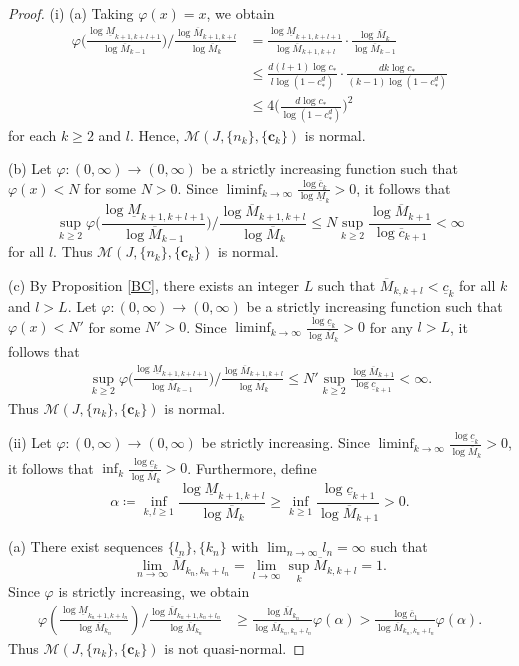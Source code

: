 \documentclass[12pt]{amsart}
\numberwithin{equation}{section}
\theoremstyle{plain}
\theoremstyle{remark}
\theoremstyle{definition}
\newcommand{\om}{\overline{M}}
\newcommand{\um}{\underline{M}}
\newcommand{\ccc}{\mathbf{c}}
\newcommand{\f}{\frac}
\newcommand{\oc}{\overline{c}}
\newcommand{\uc}{\underline{c}}
\renewcommand{\ge}{\geqslant}
\renewcommand{\le}{\leqslant}
\begin{document}
	\begin{proof}%
		(i) (a) Taking $\varphi(x)=x$,  we obtain
		\begin{align*}
			\varphi\Big(\frac{\log \um_{k+1,k+l+1}}{\log \om_{k-1}}\Big)\Big/\frac{\log \om_{k+1,k+l}}{\log \om_{k}}&=\f{\log \um_{k+1,k+l+1}}{\log \om_{k+1,k+l}}\cdot \f{\log \om_k}{\log \om_{k-1}}\\
			&\le \f{d(l+1)\log c_*}{l\log (1-c_*^d)}\cdot \f{dk\log c_*}{(k-1)\log (1-c_*^d)}\\
			&\le 4 \Big(\f{d\log c_*}{\log (1-c_*^d)}\Big)^2
		\end{align*}
		for each $k\ge 2$ and $l$. Hence, $\mathcal{M}(J,\{n_k\},\{\ccc_k\})$ is normal. 
		
		(b)  Let $\varphi:(0,\infty)\to (0,\infty)$ be a strictly increasing function such that $\varphi(x)<N$ for some $N>0$. Since $\liminf_{k\to\infty}\f{\log \oc_k}{\log \um_k}>0$,  it follows that
		\[
		\sup_{k\ge 2}\varphi\Big(\frac{\log \um_{k+1,k+l+1}}{\log \om_{k-1}}\Big)\Big/\frac{\log \om_{k+1,k+l}}{\log \om_{k}}\le N\sup_{k\ge 2}\frac{\log \om_{k+1}}{\log \oc_{k+1}}<\infty
		\]
		for all $l$.
		Thus $\mathcal{M}(J,\{n_k\},\{\ccc_k\})$ is normal.
		
		(c) By Proposition \ref{BC}, there exists an integer $L$ such that $	\om_{k,k+l}<\uc_k $	for all $k$ and $l>L$. Let $\varphi:(0,\infty)\to (0,\infty)$ be a strictly increasing function such that $\varphi(x)<N'$ for some $N'>0$. Since $\liminf_{k\to\infty}\f{\log \uc_k}{\log \om_k}>0$ for any $l>L$, it follows that
		\begin{align*}
			\sup_{k\ge 2}\varphi\Big(\frac{\log \um_{k+1,k+l+1}}{\log \om_{k-1}}\Big)\Big/\frac{\log \om_{k+1,k+l}}{\log \om_{k}}\le N'\sup_{k\ge 2}\frac{\log \om_{k+1}}{\log \uc_{k+1}}<\infty.
		\end{align*}
		Thus $\mathcal{M}(J,\{n_k\},\{\ccc_k\})$ is normal.
		
		
		
		
		(ii) Let $\varphi:(0,\infty)\to (0,\infty)$ be strictly increasing. Since $\liminf_{k\to\infty}\frac{\log \uc_k}{\log \om_k}>0$, it follows that $\inf_k \frac{\log \uc_k}{\log \om_k}>0$. Furthermore, define
        \[
		\alpha\coloneq\inf_{k,l\ge 1}\f{\log \um_{k+1,k+l}}{\log \om_k}\ge \inf_{k\ge 1}\f{\log \uc_{k+1}}{\log \om_{k+1}}>0.
		\]
	
		(a) There exist sequences $\{l_n\},\{k_n\}$ with $\lim_{n\to\infty}l_n =\infty$  such that
		\[
		\lim_{n\to\infty}\om_{k_n,k_n+l_n}=\lim_{l\to\infty}\sup_k \om_{k,k+l}=1.
		\]
		Since $\varphi$ is strictly increasing, we obtain
		\begin{align*}
			\varphi\left(\frac{\log \um_{k_n+1,k+l_n}}{\log \om_{k_n}}\right)\bigg/\frac{\log \om_{k_n+1,k_n+l_n}}{\log \om_{k_n}}&\ge \f{\log \om_{k_n}}{\log \om_{k_n,k_n+l_n}}\varphi\left(\alpha\right)
			>\f{\log \oc_1}{\log \om_{k_n,k_n+l_n}}\varphi\left(\alpha\right).  
		\end{align*}
		Thus $\mathcal{M}(J,\{n_k\},\{\ccc_k\})$ is not quasi-normal.
		

\end{proof}
\end{document}
